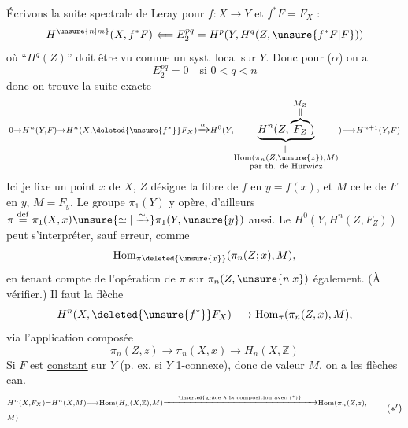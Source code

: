 Écrivons la suite spectrale de Leray pour $f:X\to Y$ et $f^*F=F_X$ :
\[
H^{\unsure{n|m}}(X,f^*F)\Longleftarrow E^{pq}_2=H^p(Y,H^q(Z,\unsure{f^*F|F}))
\]
où ``$H^q(Z)$'' doit être vu comme un syst. local sur $Y$. Donc pour ($\alpha$) on a
\[
E^{pq}_2=0\quad\text{si }0<q<n
\]
donc on trouve la suite exacte
\[
\scriptstyle 0\to H^n(Y,F)\to H^n(X,\deleted{\unsure{f^*}}F_X)
\xrightarrow{\alpha}H^0(Y,\underbrace{H^n(Z,\overbrace{F_Z}^{\substack{M_Z\\\Vert}})}_{\substack{\Vert\\\mathrm{Hom}(\pi_n(Z,\unsure{z}),M)\\\text{par th. de Hurwicz}}})\longrightarrow H^{n+1}(Y,F)
\]
Ici  je fixe un point $x$ de $X$, $Z$ désigne la fibre de $f$ en $y=f(x)$, et $M$ celle de $F$ en $y$, $M=F_y$. Le groupe $\pi_1(Y)$ y opère, d'ailleurs $\pi\overset{\mathrm{def}}{=}\pi_1(X,x)\unsure{\simeq|\xrightarrow{\sim}}\pi_1(Y,\unsure{y})$ aussi. Le $H^0(Y,H^n(Z,F_Z))$ peut s'interpréter, sauf erreur, comme
\[
\mathrm{Hom}_{\pi\deleted{\unsure{x}}}(\pi_n(Z;x),M),
\]
en tenant compte de l'opération de $\pi$  sur $\pi_n(Z,\unsure{n|x})$ également. (À vérifier.) Il faut  la flèche
\[
H^n(X,\deleted{\unsure{f^*}}F_X)\longrightarrow\mathrm{Hom}_{\pi}(\pi_n(Z,x),M),
\]
via l'application composée
\[
\pi_n(Z,z)\longrightarrow\pi_n(X,x)\longrightarrow H_n(X,\mathbb Z)
\tag*{(*)}
\]
Si $F$ est \uline{constant} sur $Y$ (p. ex. si $Y$ 1-connexe), donc de valeur $M$, on a les flèches can.
\[
\begin{aligned}
&\scriptstyle H^n(X,F_X)=H^n(X,M)\longrightarrow\mathrm{Hom}(H_n(X,\mathbb Z),M)\xrightarrow{\inserted{\text{grâce à la composition avec (*)}}}\mathrm{Hom}(\pi_n(Z,z),\\
&\hfill\scriptstyle M)
\end{aligned}
\tag*{($*'$)}
\]

